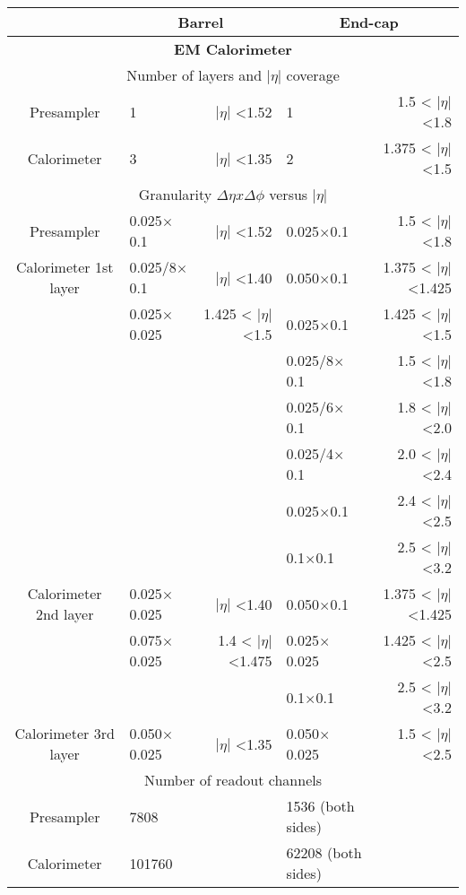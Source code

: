 	\begin{table}
		\centering
		\begin{tabular}{|c|l r| l r|}
			\hline
		     &
			 \multicolumn{2}{|c|}{ Barrel} &
			\multicolumn{2}{|c|}{ End-cap} \\
			\hline
		   \multicolumn{5}{|c|}{\textbf{EM Calorimeter}} \\
			\hline			
			\multicolumn{5}{|c|}{Number of layers and $|\eta|$ coverage} \\
			\hline			
			Presampler & 1 &$|\eta|$  <1.52  & 1 & 1.5 < $|\eta|$  <1.8\\
			\hline
			Calorimeter& 3 &$|\eta|$  <1.35  & 2 & 1.375 < $|\eta|$  <1.5\\
			\hline
			\multicolumn{5}{|c|}{Granularity $\Delta \eta x \Delta \phi$ versus $|\eta|$} \\
			\hline
			Presampler& 0.025$\times$0.1 &$|\eta|$  <1.52  & 0.025$\times$0.1 & 1.5 < $|\eta|$  <1.8\\
			\hline
			Calorimeter 1st layer& 0.025/8$\times$0.1 &$|\eta|$  <1.40  & 0.050$\times$0.1 & 1.375 < $|\eta|$  <1.425\\
			& 0.025$\times$0.025 &1.425 < $|\eta|$  <1.5  & 0.025$\times$0.1 & 1.425 < $|\eta|$  <1.5\\
			&  &  & 0.025/8$\times$0.1 & 1.5 < $|\eta|$  <1.8\\
			&  &  & 0.025/6$\times$0.1 & 1.8 < $|\eta|$  <2.0\\
			&  &  & 0.025/4$\times$0.1 & 2.0 < $|\eta|$  <2.4\\
			&  &  & 0.025$\times$0.1 & 2.4 < $|\eta|$  <2.5\\
			&  &  & 0.1$\times$0.1 & 2.5 < $|\eta|$  <3.2\\
			\hline
			Calorimeter 2nd layer& 0.025$\times$0.025 &$|\eta|$  <1.40  & 0.050$\times$0.1 & 1.375 < $|\eta|$  <1.425\\
			& 0.075$\times$0.025 &1.4 < $|\eta|$  <1.475  & 0.025$\times$0.025 & 1.425 < $|\eta|$  <2.5\\
			&  &  & 0.1$\times$0.1 & 2.5 < $|\eta|$  <3.2\\
			\hline
			Calorimeter 3rd layer& 0.050$\times$0.025 &$|\eta|$  <1.35  & 0.050$\times$0.025 & 1.5 < $|\eta|$  <2.5\\
			\hline
			\multicolumn{5}{|c|}{Number of readout channels} \\
			\hline
			Presampler& 7808& & 1536 (both sides) & \\
			Calorimeter& 101760& &62208 (both sides) & \\

\end{tabular}
\end{table}
